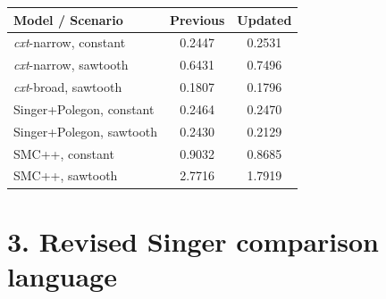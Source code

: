 \documentclass[10pt]{article}
\begin{document}
\vspace{4pt}
\begin{center}
\small
\begin{tabular}{@{}lcc@{}}
\toprule
\textbf{Model / Scenario} & \textbf{Previous} & \textbf{Updated} \\
\midrule
\textit{cxt}-narrow, constant      & 0.2447 & 0.2531 \\
\textit{cxt}-narrow, sawtooth      & 0.6431 & 0.7496 \\
\textit{cxt}-broad, sawtooth       & 0.1807 & 0.1796 \\
Singer+Polegon, constant           & 0.2464 & 0.2470 \\
Singer+Polegon, sawtooth           & 0.2430 & 0.2129 \\
SMC++, constant                    & 0.9032 & 0.8685 \\
SMC++, sawtooth                    & 2.7716 & 1.7919 \\
\bottomrule
\end{tabular}
\end{center}


\section*{\textcolor{accent}{3. Revised Singer comparison language}}
\end{document}
